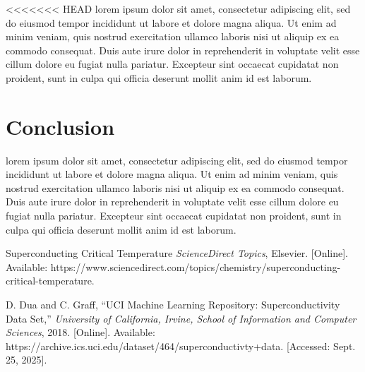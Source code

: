 \documentclass[conference]{IEEEtran}
\begin{document}
<<<<<<< HEAD
lorem ipsum dolor sit amet, consectetur adipiscing elit, sed do eiusmod tempor incididunt ut labore et dolore magna aliqua. Ut enim ad minim veniam, quis nostrud exercitation ullamco laboris nisi ut aliquip ex ea commodo consequat. Duis aute irure dolor in reprehenderit in voluptate velit esse cillum dolore eu fugiat nulla pariatur. Excepteur sint occaecat cupidatat non proident, sunt in culpa qui officia deserunt mollit anim id est laborum.
\section{Conclusion}
lorem ipsum dolor sit amet, consectetur adipiscing elit, sed do eiusmod tempor incididunt ut labore et dolore magna aliqua. Ut enim ad minim veniam, quis nostrud exercitation ullamco laboris nisi ut aliquip ex ea commodo consequat. Duis aute irure dolor in reprehenderit in voluptate velit esse cillum dolore eu fugiat nulla pariatur. Excepteur sint occaecat cupidatat non proident, sunt in culpa qui officia deserunt mollit anim id est laborum.
\begin{thebibliography}{00}

Superconducting Critical Temperature \emph{ScienceDirect Topics}, Elsevier. [Online]. 
Available: https://www.sciencedirect.com/topics/chemistry/superconducting-critical-temperature. 

D. Dua and C. Graff, ``UCI Machine Learning Repository: Superconductivity Data Set,'' 
\emph{University of California, Irvine, School of Information and Computer Sciences}, 2018. 
[Online]. Available: https://archive.ics.uci.edu/dataset/464/superconductivty+data. 
[Accessed: Sept. 25, 2025].

\end{thebibliography}
\end{document}
